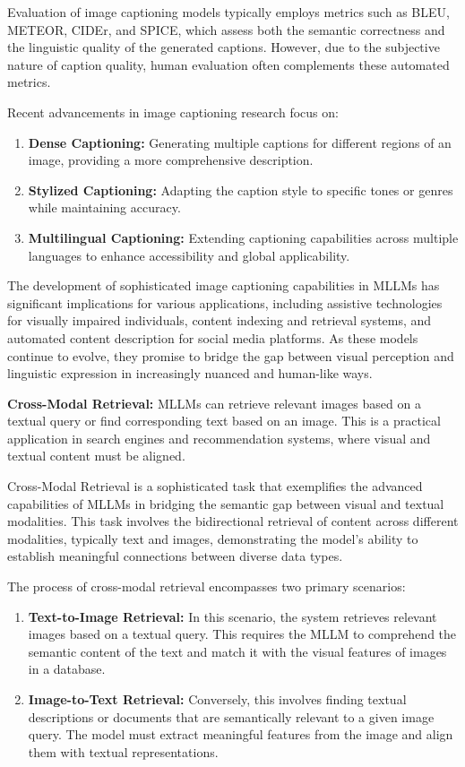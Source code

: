 Evaluation of image captioning models typically employs metrics such as BLEU, METEOR, CIDEr, and SPICE, which assess both the semantic correctness and the linguistic quality of the generated captions. However, due to the subjective nature of caption quality, human evaluation often complements these automated metrics.

Recent advancements in image captioning research focus on:

\begin{enumerate}
    \item \textbf{Dense Captioning:} Generating multiple captions for different regions of an image, providing a more comprehensive description.
    \item \textbf{Stylized Captioning:} Adapting the caption style to specific tones or genres while maintaining accuracy.
    \item \textbf{Multilingual Captioning:} Extending captioning capabilities across multiple languages to enhance accessibility and global applicability.
\end{enumerate}

The development of sophisticated image captioning capabilities in MLLMs has significant implications for various applications, including assistive technologies for visually impaired individuals, content indexing and retrieval systems, and automated content description for social media platforms. As these models continue to evolve, they promise to bridge the gap between visual perception and linguistic expression in increasingly nuanced and human-like ways.


\textbf{Cross-Modal Retrieval:} MLLMs can retrieve relevant images based on a textual query or find corresponding text based on an image. This is a practical application in search engines and recommendation systems, where visual and textual content must be aligned.

Cross-Modal Retrieval is a sophisticated task that exemplifies the advanced capabilities of MLLMs in bridging the semantic gap between visual and textual modalities. This task involves the bidirectional retrieval of content across different modalities, typically text and images, demonstrating the model's ability to establish meaningful connections between diverse data types.

The process of cross-modal retrieval encompasses two primary scenarios:

\begin{enumerate}
    \item \textbf{Text-to-Image Retrieval:} In this scenario, the system retrieves relevant images based on a textual query. This requires the MLLM to comprehend the semantic content of the text and match it with the visual features of images in a database.
    \item \textbf{Image-to-Text Retrieval:} Conversely, this involves finding textual descriptions or documents that are semantically relevant to a given image query. The model must extract meaningful features from the image and align them with textual representations.
\end{enumerate}

